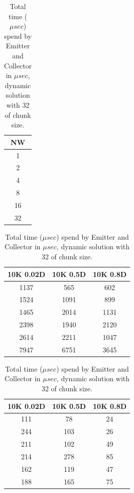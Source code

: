 \begin{table}[!htb]
\centering
\begin{minipage}{0.08\textwidth}
\centering
\begin{tabular}{|c|}
\hline
NW \\ \hline
1          \\ \hline
2      \\ \hline
4           \\ \hline
8            \\ \hline
16       \\ \hline
32          \\ \hline
\end{tabular}
\end{minipage}
\begin{minipage}{0.43\textwidth}
\centering
\begin{tabular}{|c|c|c|}
\hline
10K 0.02D & 10K 0.5D & 10K 0.8D \\ \hline
1137       & 565      & 602      \\ \hline
1524       & 1091     & 899      \\ \hline
1465       & 2014     & 1131     \\ \hline
2398      & 1940      & 2120     \\ \hline
2614      & 2211     & 1047     \\ \hline
7947      & 6751     & 3645     \\ \hline
\end{tabular}
\end{minipage}
\begin{minipage}{0.43\textwidth}
\centering
\begin{tabular}{|c|c|c|}
\hline
10K 0.02D & 10K 0.5D & 10K 0.8D \\ \hline
111       & 78       & 24       \\ \hline
244       & 103      & 26       \\ \hline
211       & 102      & 49       \\ \hline
214       & 278      & 85       \\ \hline
162       & 119      & 47       \\ \hline
188       & 165      & 75       \\ \hline
\end{tabular}
\end{minipage}
\caption{Total time ($\mu sec$) spend by Emitter and Collector in $\mu sec$, dynamic solution with 32 of chunk size.}
\label{table:emit_coll_dy}
\end{table}
\FloatBarrier


